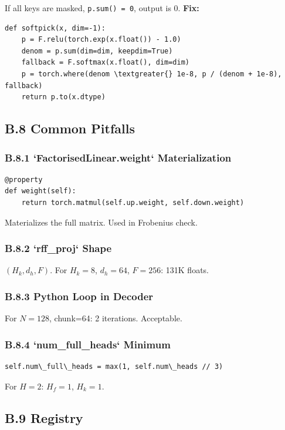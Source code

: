 If all keys are masked, \texttt{p.sum() = 0}, output is 0. \textbf{Fix:}

\begin{lstlisting}
def softpick(x, dim=-1):
    p = F.relu(torch.exp(x.float()) - 1.0)
    denom = p.sum(dim=dim, keepdim=True)
    fallback = F.softmax(x.float(), dim=dim)
    p = torch.where(denom \textgreater{} 1e-8, p / (denom + 1e-8), fallback)
    return p.to(x.dtype)
\end{lstlisting}

\subsection{B.8 Common Pitfalls}

\subsubsection{B.8.1 `FactorisedLinear.weight` Materialization}

\begin{lstlisting}
@property
def weight(self):
    return torch.matmul(self.up.weight, self.down.weight)
\end{lstlisting}

Materializes the full matrix. Used in Frobenius check.

\subsubsection{B.8.2 `rff\_proj` Shape}

$(H_k, d_h, F)$. For $H_k = 8$, $d_h = 64$, $F = 256$: 131K floats.

\subsubsection{B.8.3 Python Loop in Decoder}

For $N = 128$, chunk=64: 2 iterations. Acceptable.

\subsubsection{B.8.4 `num\_full\_heads` Minimum}

\begin{lstlisting}
self.num\_full\_heads = max(1, self.num\_heads // 3)
\end{lstlisting}

For $H = 2$: $H_f = 1$, $H_k = 1$.

\subsection{B.9 Registry}

